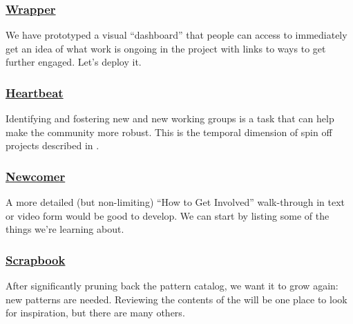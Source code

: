 \subsubsection*{\hyperref[sec:Wrapper]{Wrapper}}
We have prototyped a visual ``dashboard'' that people can access to immediately get an idea of what work is ongoing in the project with links to ways to get further engaged.  Let's deploy it.

\subsubsection*{\hyperref[sec:Heartbeat]{Heartbeat}} Identifying and fostering new  and new working groups is a task that can help make the community more robust.  This is the temporal dimension of spin off projects described in .

\subsubsection*{\hyperref[sec:Newcomer]{Newcomer}} A more detailed (but non-limiting) ``How to Get Involved'' walk-through in text or video form would be good to develop. We can start by listing some of the things we're learning about.

\subsubsection*{\hyperref[sec:Scrapbook]{Scrapbook}} 
After significantly pruning back the pattern catalog, we want it to grow again: new patterns are needed.  Reviewing the contents of the  will be one place to look for inspiration, but there are many others.




